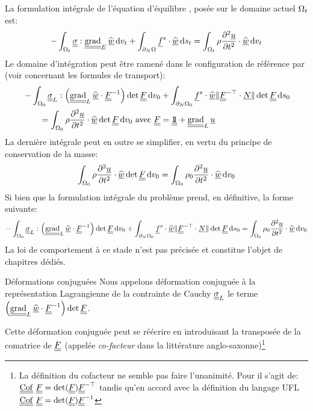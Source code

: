 \documentclass[10pt]{book}
\begin{document}
La formulation intégrale de l'équation d'équilibre , posée sur le domaine actuel $\Omega_{t}$ est:
$$-\int_{\Configuration_{t}}\SC:\tgrad_{E}\DepVirt\dvt+\int_{\dNOm}\FSurf\cdot\DepVirt\dst=\int_{\Configuration_{t}}\rho\dfrac{\partial^{2}\Dep}{\partial t^{2}}\cdot\DepVirt\dvt$$
Le domaine d'intégration peut être ramené dans le configuration de référence par (voir \cite{garrigues2016cinematique} concernant les formules de transport):
\begin{equation}
\begin{aligned}
&-\int_{\Configuration_{0}}\SC_{L}:\left(\tgrad_{L}\DepVirt\cdot\GT^{-1}\right)\det\GT\dvo+\int_{\dNOm_{0}}\FSurf\cdot\DepVirt\Vert\GT^{-\top}\cdot\NormaleInit\Vert\det\GT\dso\\
&\qquad =\int_{\Configuration_{0}}\rho\dfrac{\partial^{2}\Dep}{\partial t^{2}}\cdot\DepVirt\det\GT\dvo  \avec \GT=\TU+\tgrad_{L}\Dep
\end{aligned}
\label{eq:forme_faible_config_ref}
\end{equation}
La dernière intégrale peut en outre se simplifier, en vertu du principe de conservation de la masse:
\begin{equation}
\int_{\Omega_{0}}\rho\dfrac{\partial^{2}\underline{u}}{\partial t^{2}}\cdot\widehat{\underline{w}}\det\underline{\underline{F}}\,\mathrm{d}v_{0}=\int_{\Omega_{0}}\rho_{0}\dfrac{\partial^{2}\underline{u}}{\partial t^{2}}\cdot\widehat{\underline{w}}\,\mathrm{d}v_{0}
\label{eq:simplification_forme_mass}
\end{equation}
Si bien que la formulation intégrale du problème prend, en définitive, la forme suivante:
\begin{equation}
-\int_{\Configuration_{0}}\SC_{L}:\left(\tgrad_{L}\DepVirt\cdot\GT^{-1}\right)\det\GT\dvo+\int_{\dNOm_{0}}\FSurf\cdot\DepVirt\Vert\GT^{-\top}\cdot\NormaleInit\Vert\det\GT\dso=\int_{\Configuration_{0}}\rho_{0}\dfrac{\partial^{2}\Dep}{\partial t^{2}}\cdot\DepVirt\dvo
\label{eq:forme_faible_config_ref_finale}
\end{equation}
La loi de comportement à ce stade n'est pas précisée et constitue l'objet de chapitres dédiés.
\begin{Defi}{Déformations conjuguées} Nous appelons déformation conjuguée à la représentation Lagrangienne de la contrainte de Cauchy $\underline{\underline{\sigma}}_{L}$ le terme $\left(\tgrad_{L}\DepVirt\cdot\GT^{-1}\right)\det\GT$.
\end{Defi}
Cette déformation conjuguée peut se réécrire en introduisant la transposée de la comatrice de $\underline{\underline{F}}$ (appelée \emph{co-facteur} dans la littérature anglo-saxonne)\footnote{La définition du cofacteur ne semble pas faire l'unanimité. Pour \cite{hesch2017framework} il s'agit de: $\Cof\GT=\det(\GT)\GT^{-\top}$ tandis qu'en accord avec la définition du langage UFL 
$\Cof\GT=\det(\GT) \GT^{-1}$}
\end{document}
